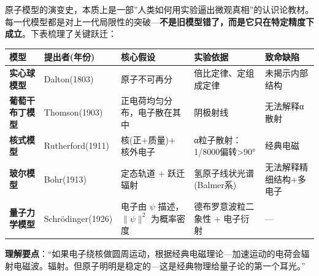 原子模型的演变史，本质上是一部''人类如何用实验逼出微观真相''的认识论教材。每一代模型都是对上一代局限性的突破---\textbf{不是旧模型错了，而是它只在特定精度下成立}。下表梳理了关键跃迁：

{\def\LTcaptype{none} %
\begin{longtable}[]{@{}
  >{\raggedright\arraybackslash}p{}
  >{\raggedright\arraybackslash}p{}
  >{\raggedright\arraybackslash}p{}
  >{\raggedright\arraybackslash}p{}
  >{\raggedright\arraybackslash}p{}@{}}
\toprule\noalign{}
\begin{minipage}[b]{\linewidth}\raggedright
模型
\end{minipage} & \begin{minipage}[b]{\linewidth}\raggedright
提出者(年份)
\end{minipage} & \begin{minipage}[b]{\linewidth}\raggedright
核心假设
\end{minipage} & \begin{minipage}[b]{\linewidth}\raggedright
实验依据
\end{minipage} & \begin{minipage}[b]{\linewidth}\raggedright
致命缺陷
\end{minipage} \\
\midrule\noalign{}
\endhead
\bottomrule\noalign{}
\endlastfoot
\textbf{实心球模型} & Dalton(1803) & 原子不可再分 & 倍比定律、定组成定律 & 未揭示内部结构 \\
\textbf{葡萄干布丁模型} & Thomson(1903) & 正电荷均匀分布，电子散在其中 & 阴极射线 & 无法解释α散射 \\
\textbf{核式模型} & Rutherford(1911) & 核(正+质量)+ 核外电子 & α粒子散射：1/8000偏转\textgreater90° & 经典电磁 \\
\textbf{玻尔模型} & Bohr(1913) & 定态轨道 + 跃迁辐射 & 氢原子线状光谱(Balmer系) & 无法解释精细结构+多电子 \\
\textbf{量子力学模型} & Schrödinger(1926) & 电子由 \(\psi\) 描述，\(\|\psi\|^2\) 为概率密度 & 德布罗意波粒二象性 + 电子衍射 & --- \\
\end{longtable}
}

\textbf{理解要点}：``如果电子绕核做圆周运动，根据经典电磁理论---加速运动的电荷会辐射电磁波。辐射。但原子明明是稳定的---这是经典物理给量子论的第一个耳光。''

